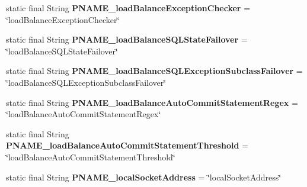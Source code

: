 \begin{DoxyCompactItemize}
\item 
\mbox{\label{classcom_1_1mysql_1_1cj_1_1conf_1_1_property_definitions_a5bda2d03807c3dcc3b595d01bbbb1d21}} 
static final String {\bfseries P\+N\+A\+M\+E\+\_\+load\+Balance\+Exception\+Checker} = \char`\"{}load\+Balance\+Exception\+Checker\char`\"{}
\item 
\mbox{\label{classcom_1_1mysql_1_1cj_1_1conf_1_1_property_definitions_a5e4e8032a45cc35b0d20618e3af00c28}} 
static final String {\bfseries P\+N\+A\+M\+E\+\_\+load\+Balance\+S\+Q\+L\+State\+Failover} = \char`\"{}load\+Balance\+S\+Q\+L\+State\+Failover\char`\"{}
\item 
\mbox{\label{classcom_1_1mysql_1_1cj_1_1conf_1_1_property_definitions_ab66609e6e7b93718aae19d1efcf660f3}} 
static final String {\bfseries P\+N\+A\+M\+E\+\_\+load\+Balance\+S\+Q\+L\+Exception\+Subclass\+Failover} = \char`\"{}load\+Balance\+S\+Q\+L\+Exception\+Subclass\+Failover\char`\"{}
\item 
\mbox{\label{classcom_1_1mysql_1_1cj_1_1conf_1_1_property_definitions_acb3118bf171ccd8a2f027eecdf45d408}} 
static final String {\bfseries P\+N\+A\+M\+E\+\_\+load\+Balance\+Auto\+Commit\+Statement\+Regex} = \char`\"{}load\+Balance\+Auto\+Commit\+Statement\+Regex\char`\"{}
\item 
\mbox{\label{classcom_1_1mysql_1_1cj_1_1conf_1_1_property_definitions_abab7b8948ba332d99f2a08f85a47eacd}} 
static final String {\bfseries P\+N\+A\+M\+E\+\_\+load\+Balance\+Auto\+Commit\+Statement\+Threshold} = \char`\"{}load\+Balance\+Auto\+Commit\+Statement\+Threshold\char`\"{}
\item 
\mbox{\label{classcom_1_1mysql_1_1cj_1_1conf_1_1_property_definitions_aeaad222426576734a6bca28c66d00565}} 
static final String {\bfseries P\+N\+A\+M\+E\+\_\+local\+Socket\+Address} = \char`\"{}local\+Socket\+Address\char`\"{}
\item 
\mbox{\label{classcom_1_1mysql_1_1cj_1_1conf_1_1_property_definitions_aa9e12d239be2c6369abc82edd22afc48}} 

\end{DoxyCompactItemize}
